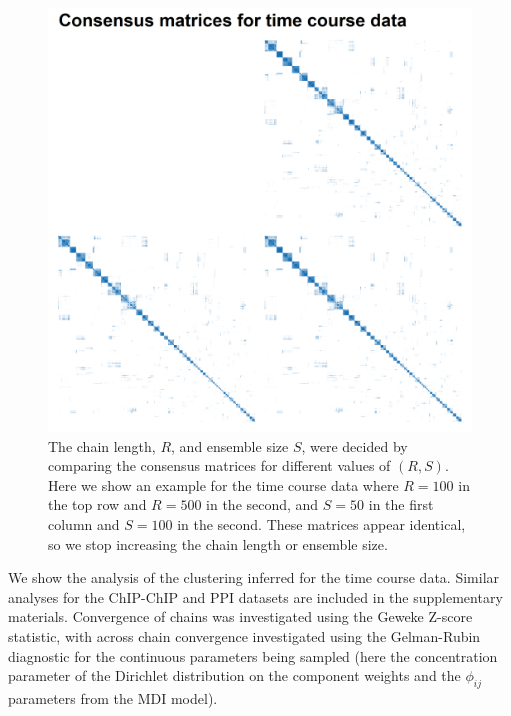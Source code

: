 \documentclass{bioinfo}
\begin{document}
\begin{figure} %
	\centering
	\includegraphics[scale=0.5]{./Images/Yeast/CMs.png}	
	\caption{The chain length, $R$, and ensemble size $S$, were decided by comparing the consensus matrices for different values of $(R, S)$. Here we show an example for the time course data where $R=100$ in the top row and $R=500$ in the second, and $S=50$ in the first column and $S=100$ in the second. These matrices appear identical, so we stop increasing the chain length or ensemble size.}
	\label{fig:yeastCMs}
\end{figure}
We show the analysis of the clustering inferred for the time course data. Similar analyses for the ChIP-ChIP and PPI datasets are included in the supplementary materials.
Convergence of chains was investigated using the Geweke Z-score statistic, with across chain convergence investigated using the Gelman-Rubin diagnostic for the continuous parameters being sampled (here the concentration parameter of the Dirichlet distribution on the component weights and the $\phi_{ij}$ parameters from the MDI model). 
\end{document}
